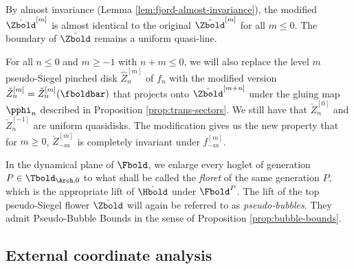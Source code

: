 \documentclass{amsart}
\begin{document}
By almost invariance (Lemma \ref{lem:fjord-almost-invariance}), 
the modified $\check{\Zbold}^{[m]}$ is almost identical to the original $\hat{\Zbold}^{[m]}$ for all $m \leq 0$.
The boundary of $\check{\Zbold}$ remains a uniform quasi-line.

For all $n \leq 0$ and $m \geq -1$ with $n+m \leq 0$, we will also replace the level $m$ pseudo-Siegel pinched disk $\hat{Z}_n^{[m]}$ of $f_n$ with the modified version $\check{Z}_n^{[m]} = \check{Z}_n^{[m]}(\fboldbar)$ that projects onto $\check{\Zbold}^{[m+n]}$ under the gluing map $\pphi_n$ described in Proposition \ref{prop:trans-sectors}.
We still have that $\check{Z}_n^{[0]}$ and $\check{Z}_n^{[-1]}$ are uniform quasidisks.
The modification gives us the new property that for $m \geq 0$, $\check{Z}_{-m}^{[m]}$ is completely invariant under $f_{-m}^{[m]}$.

In the dynamical plane of $\Fbold$, we enlarge every hoglet of generation $P \in \Tbold_{\Arch,0}$ to what shall be called the \emph{floret} of the same generation $P$, which is the appropriate lift of $\check{\Hbold}$ under $\Fbold^P$. 
The lift of the top pseudo-Siegel flower $\check{\Zbold}$ will again be referred to as \emph{pseudo-bubbles}.
They admit Pseudo-Bubble Bounds in the sense of Proposition \ref{prop:bubble-bounds}.

\subsection{External coordinate analysis}
\end{document}
